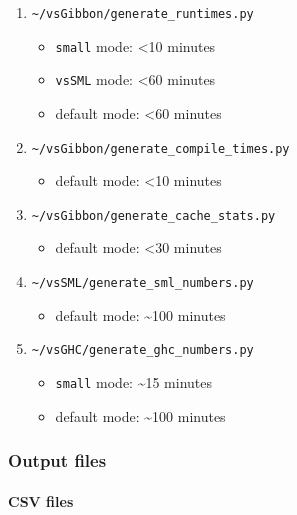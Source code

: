 \begin{enumerate}
\def\labelenumi{\arabic{enumi}.}
\tightlist
\item
  \texttt{\textasciitilde{}/vsGibbon/generate\_runtimes.py}

  \begin{itemize}
  \tightlist
  \item
    \texttt{small} mode: \textless10 minutes
  \item
    \texttt{vsSML} mode: \textless60 minutes
  \item
    default mode: \textless60 minutes
  \end{itemize}
\item
  \texttt{\textasciitilde{}/vsGibbon/generate\_compile\_times.py}

  \begin{itemize}
  \tightlist
  \item
    default mode: \textless10 minutes
  \end{itemize}
\item
  \texttt{\textasciitilde{}/vsGibbon/generate\_cache\_stats.py}

  \begin{itemize}
  \tightlist
  \item
    default mode: \textless30 minutes
  \end{itemize}
\item
  \texttt{\textasciitilde{}/vsSML/generate\_sml\_numbers.py}

  \begin{itemize}
  \tightlist
  \item
    default mode: \textasciitilde100 minutes
  \end{itemize}
\item
  \texttt{\textasciitilde{}/vsGHC/generate\_ghc\_numbers.py}

  \begin{itemize}
  \tightlist
  \item
    \texttt{small} mode: \textasciitilde15 minutes
  \item
    default mode: \textasciitilde100 minutes
  \end{itemize}
\end{enumerate}

\hypertarget{output-files}{%
\subsubsection{Output files}\label{output-files}}

\hypertarget{csv-files}{%
\paragraph{CSV files}\label{csv-files}}

